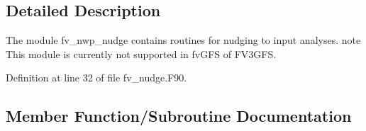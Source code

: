 \subsection{Detailed Description}
The module fv\-\_\-nwp\-\_\-nudge contains routines for nudging to input analyses. note This module is currently not supported in fv\-G\-F\-S of F\-V3\-G\-F\-S. 

Definition at line 32 of file fv\-\_\-nudge.\-F90.



\subsection{Member Function/\-Subroutine Documentation}
